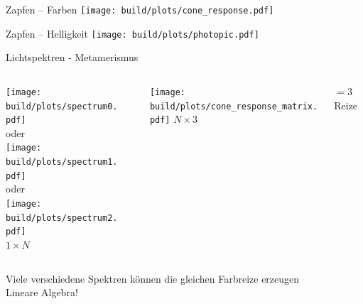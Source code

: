 \documentclass[aspectratio=1610, 9pt]{beamer}
\begin{document}
\begin{frame}[c, plain]
\end{frame}


\begin{frame}[t]{Zapfen – Farben}
  \texttt{[image: build/plots/cone\_response.pdf]} 
\end{frame}

\begin{frame}[t]{Zapfen – Helligkeit}
  \texttt{[image: build/plots/photopic.pdf]} 
\end{frame}


\begin{frame}{Lichtspektren - Metamerismus}

  \begin{columns}[onlytextwidth]
    \begin{column}{0.35\textwidth}
      \centering%
      \texttt{[image: build/plots/spectrum0.pdf]}\\[0.2cm]
      oder\\
      \texttt{[image: build/plots/spectrum1.pdf]}\\[0.2cm]
      oder\\
      \texttt{[image: build/plots/spectrum2.pdf]}\\[0.2cm]
      \Huge $1\times N$
    \end{column}
    \begin{column}{0.04\textwidth}
    \end{column}
    \begin{column}{0.35\textwidth}
      \centering%
      \texttt{[image: build/plots/cone\_response\_matrix.pdf]}
      \Huge $N \times 3$
    \end{column}
    \begin{column}{0.20\textwidth}
      \Huge ${}=3$ Reize
    \end{column}
  \end{columns}
  \vspace{0.5cm}
  Viele verschiedene Spektren können die gleichen Farbreize erzeugen \\
  Lineare Algebra!
\end{frame}
\end{document}
